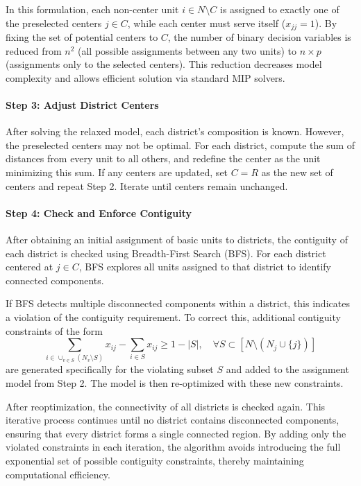 \documentclass[preprint,12pt,authoryear]{elsarticle}
\begin{document}
In this formulation, each non-center unit \( i \in N \setminus C \) is assigned to exactly one of the preselected centers \( j \in C \), while each center must serve itself (\(x_{jj}=1\)). By fixing the set of potential centers to \( C \), the number of binary decision variables is reduced from \( n^2 \) (all possible assignments between any two units) to \( n \times p \) (assignments only to the selected centers). This reduction decreases model complexity and allows efficient solution via standard MIP solvers.

\paragraph{Step 3: Adjust District Centers}

After solving the relaxed model, each district’s composition is known. 
However, the preselected centers may not be optimal. 
For each district, compute the sum of distances from every unit to all others, and redefine the center as the unit minimizing this sum. 
If any centers are updated, set \(C = R\) as the new set of centers and repeat Step 2. 
Iterate until centers remain unchanged.

\paragraph{Step 4: Check and Enforce Contiguity}

After obtaining an initial assignment of basic units to districts, the contiguity of each district is checked using Breadth-First Search (BFS). For each district centered at \(j \in C\), BFS explores all units assigned to that district to identify connected components. 

If BFS detects multiple disconnected components within a district, this indicates a violation of the contiguity requirement. To correct this, additional contiguity constraints of the form
\begin{equation}
\sum_{i \in \cup_{v \in S} (N_v \setminus S)} x_{ij} - \sum_{i \in S} x_{ij} \geqslant 1 - |S|, 
\quad \forall S \subset [N \setminus (N_j \cup \{j\})]
\end{equation}
are generated specifically for the violating subset \(S\) and added to the assignment model from Step 2. The model is then re-optimized with these new constraints. 

After reoptimization, the connectivity of all districts is checked again. This iterative process continues until no district contains disconnected components, ensuring that every district forms a single connected region. By adding only the violated constraints in each iteration, the algorithm avoids introducing the full exponential set of possible contiguity constraints, thereby maintaining computational efficiency.
\end{document}
